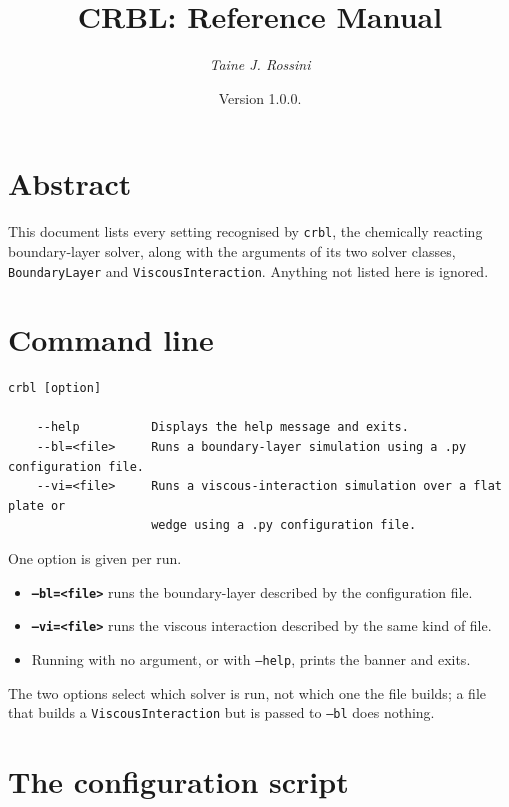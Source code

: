 \documentclass[10pt,a4paper]{article}
\title{CRBL: Reference Manual}
\author{\textit{Taine J. Rossini}}
\date{Version 1.0.0.}
\renewcommand{\_}{\origunderscore\penalty4000\relax}
\begin{document}
\maketitle

\section*{Abstract}

This document lists every setting recognised by \texttt{crbl}, the chemically reacting boundary-layer solver, along with the arguments of its two solver classes, \texttt{BoundaryLayer} and \texttt{ViscousInteraction}. Anything not listed here is ignored.


\section*{Command line}

\begin{lstlisting}[style=plain]
crbl [option]

    --help          Displays the help message and exits.
    --bl=<file>     Runs a boundary-layer simulation using a .py configuration file.
    --vi=<file>     Runs a viscous-interaction simulation over a flat plate or
                    wedge using a .py configuration file.
\end{lstlisting}

One option is given per run.

\begin{itemize}
    \item \textbf{\texttt{--bl=<file>}} runs the boundary-layer described by the configuration file.
    \item \textbf{\texttt{--vi=<file>}} runs the viscous interaction described by the same kind of file.
    \item Running with no argument, or with \texttt{--help}, prints the banner and exits.
\end{itemize}

The two options select which solver is run, not which one the file builds; a file that builds a \texttt{ViscousInteraction} but is passed to \texttt{--bl} does nothing.

\section*{The configuration script}
\end{document}
